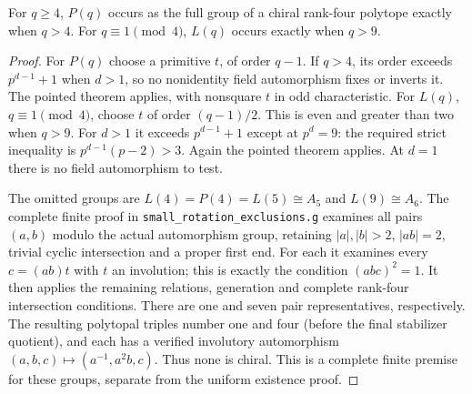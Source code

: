 \begin{proposition}\label{E.AllPointedExistence}
For $q\ge4$, $P(q)$ occurs as the full group of a chiral rank-four
polytope exactly when $q>4$. For $q\equiv1\pmod4$, $L(q)$ occurs
exactly when $q>9$.
\end{proposition}
\begin{proof}
For $P(q)$ choose a primitive $t$, of order $q-1$. If $q>4$, its order
exceeds $p^{d-1}+1$ when $d>1$, so no nonidentity field automorphism
fixes or inverts it. The pointed theorem applies, with nonsquare $t$
in odd characteristic. For $L(q)$, $q\equiv1\pmod4$, choose $t$ of
order $(q-1)/2$. This is even and greater than two when $q>9$.
For $d>1$ it exceeds $p^{d-1}+1$ except at $p^d=9$: the required
strict inequality is $p^{d-1}(p-2)>3$. Again the pointed theorem
applies. At $d=1$ there is no field automorphism to test.

The omitted groups are $L(4)=P(4)=L(5)\cong A_5$ and $L(9)\cong A_6$.
The complete finite proof in \texttt{small\_rotation\_exclusions.g}
examines all pairs $(a,b)$ modulo the actual automorphism group, retaining
$|a|,|b|>2$, $|ab|=2$, trivial cyclic intersection and a proper first end.
For each it examines every $c=(ab)t$ with $t$ an involution; this is
exactly the condition $(abc)^2=1$. It then applies the remaining
relations, generation and complete rank-four intersection conditions.
There are one and seven pair representatives, respectively. The resulting
polytopal triples number one and four (before the final stabilizer
quotient), and each has a verified involutory automorphism
$(a,b,c)\mapsto(a^{-1},a^2b,c)$. Thus none is chiral. This is a complete
finite premise for these groups, separate from the uniform existence proof.
\end{proof}
